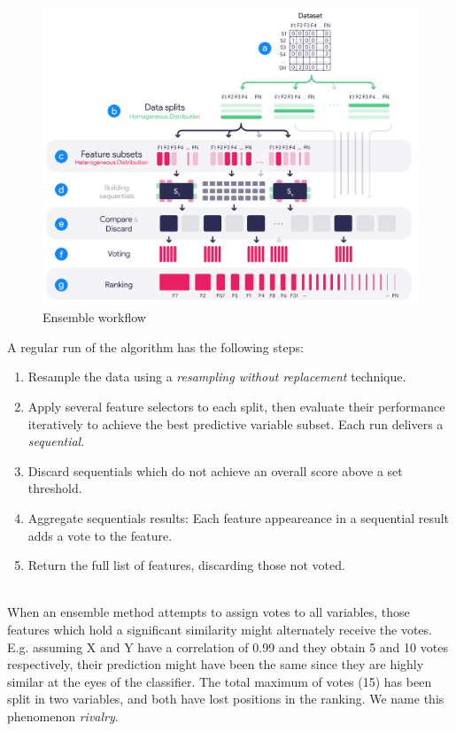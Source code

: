 \begin{figure}[!htpb]
    \centering
    \includegraphics[width=\linewidth]{Major Thesis/figures/diagrams/Ensemble.png}
    \caption{Ensemble workflow}
    \label{fig:ensemble-diagram}
\end{figure}

A regular run of the algorithm has the following steps:
\begin{enumerate}
    \item Resample the data using a \emph{resampling without replacement} technique.
    \item Apply several feature selectors to each split, then evaluate their performance iteratively to achieve the best predictive variable subset. Each run delivers a \emph{sequential}.
    \item Discard sequentials which do not achieve an overall score above a set threshold.
    \item Aggregate sequentials results: Each feature appeareance in a sequential result adds a vote to the feature.
    \item Return the full list of features, discarding those not voted.
\end{enumerate}
\\

When an ensemble method attempts to assign votes to all variables, those features which hold a significant similarity might alternately receive the votes. E.g. assuming X and Y have a correlation of 0.99 and they obtain 5 and 10 votes respectively, their prediction might have been the same since they are highly similar at the eyes of the classifier. The total maximum of votes (15) has been split in two variables, and both have lost positions in the ranking. We name this phenomenon \emph{rivalry}.

